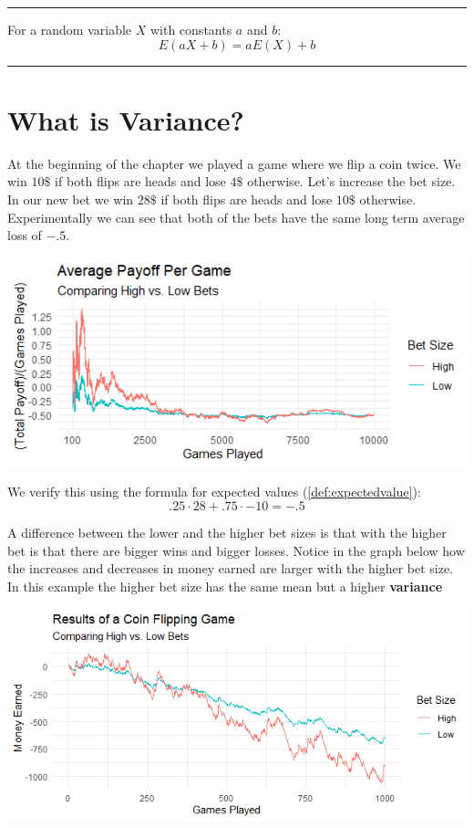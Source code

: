 \documentclass[
]{book}
\theoremstyle{definition}
\theoremstyle{definition}
\theoremstyle{definition}
\theoremstyle{remark}
\let\BeginKnitrBlock\begin \let\EndKnitrBlock\end
\begin{document}
\begin{center}\rule{0.5\linewidth}{0.5pt}\end{center}

\BeginKnitrBlock{theorem}[E(aX+b)=aE(X)+b]
\protect\hypertarget{thm:unnamed-chunk-15}{}{\label{thm:unnamed-chunk-15} {} }For a random variable \(X\) with constants \(a\) and \(b\):
\[E(aX+b) = aE(X)+b\]
\EndKnitrBlock{theorem}

\begin{center}\rule{0.5\linewidth}{0.5pt}\end{center}

\hypertarget{what-is-variance}{%
\section{What is Variance?}\label{what-is-variance}}

At the beginning of the chapter we played a game where we flip a coin twice. We win \(10\$\) if both flips are heads and lose \(4\$\) otherwise. Let's increase the bet size. In our new bet we win \(28\$\) if both flips are heads and lose \(10\$\) otherwise. Experimentally we can see that both of the bets have the same long term average loss of \(-.5\).

\includegraphics{Pictures/05-Expectations/highlowaveragepayoff.PNG}

We verify this using the formula for expected values (\ref{def:expectedvalue}):
\[.25 \cdot 28+.75 \cdot {-10}=-.5\]

A difference between the lower and the higher bet sizes is that with the higher bet is that there are bigger wins and bigger losses. Notice in the graph below how the increases and decreases in money earned are larger with the higher bet size. In this example the higher bet size has the same mean but a higher \textbf{variance}

\includegraphics{Pictures/05-Expectations/highlowbets.PNG}
\end{document}
